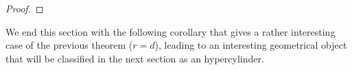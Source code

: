 \documentclass[11pt]{amsart}
\DeclareMathOperator{\rk}{rk}
\begin{document}
\begin{proof}

\end{proof}


We end this section with the following corollary that gives a rather interesting case of the previous theorem ($r=d$), leading to an interesting geometrical object that will be classified in the next section as an hypercylinder.
\end{document}

